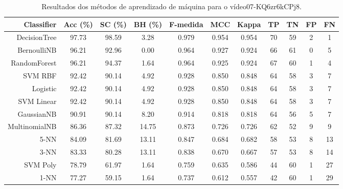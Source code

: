 \begin{table}[!htb]
\centering
\caption{Resultados dos métodos de aprendizado de máquina para o vídeo07-KQ6zr6kCPj8.}
\label{tab:07-KQ6zr6kCPj8}
\begin{tabular}{r|c|c|c|c|c|c|c|c|c|c}
\hline\hline
Classifier & Acc (\%) & SC (\%) & BH (\%) & F-medida & MCC & Kappa & TP & TN & FP & FN \\ \hline
DecisionTree & 97.73 & 98.59 & 3.28 & 0.979 & 0.954 & 0.954 & 70 & 59 & 2 & 1 \\ 
BernoulliNB & 96.21 & 92.96 & 0.00 & 0.964 & 0.927 & 0.924 & 66 & 61 & 0 & 5 \\ 
RandomForest & 96.21 & 94.37 & 1.64 & 0.964 & 0.925 & 0.924 & 67 & 60 & 1 & 4 \\ 
SVM RBF & 92.42 & 90.14 & 4.92 & 0.928 & 0.850 & 0.848 & 64 & 58 & 3 & 7 \\ 
Logistic & 92.42 & 90.14 & 4.92 & 0.928 & 0.850 & 0.848 & 64 & 58 & 3 & 7 \\ 
SVM Linear & 92.42 & 90.14 & 4.92 & 0.928 & 0.850 & 0.848 & 64 & 58 & 3 & 7 \\ 
GaussianNB & 90.91 & 90.14 & 8.20 & 0.914 & 0.818 & 0.818 & 64 & 56 & 5 & 7 \\ 
MultinomialNB & 86.36 & 87.32 & 14.75 & 0.873 & 0.726 & 0.726 & 62 & 52 & 9 & 9 \\ 
5-NN & 84.09 & 81.69 & 13.11 & 0.847 & 0.684 & 0.682 & 58 & 53 & 8 & 13 \\ 
3-NN & 83.33 & 80.28 & 13.11 & 0.838 & 0.670 & 0.667 & 57 & 53 & 8 & 14 \\ 
SVM Poly & 78.79 & 61.97 & 1.64 & 0.759 & 0.635 & 0.586 & 44 & 60 & 1 & 27 \\ 
1-NN & 77.27 & 59.15 & 1.64 & 0.737 & 0.612 & 0.557 & 42 & 60 & 1 & 29 \\ 
\hline\hline
\end{tabular}
\end{table}
